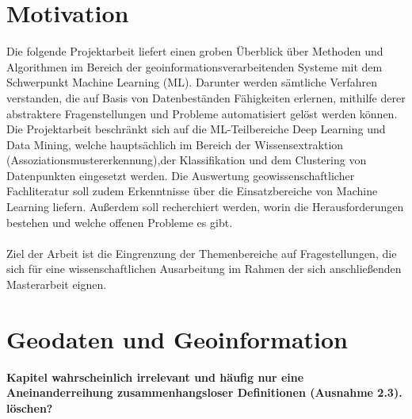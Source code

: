 \documentclass[11pt,ceqn]{book}
\begin{document}
\chapter{Motivation}
Die folgende Projektarbeit liefert einen groben Überblick über Methoden und Algorithmen im Bereich der geoinformationsverarbeitenden Systeme mit dem Schwerpunkt Machine Learning (ML). Darunter werden sämtliche Verfahren verstanden, die auf Basis von Datenbeständen  Fähigkeiten erlernen, mithilfe derer abstraktere Fragenstellungen und Probleme automatisiert gelöst werden können. Die Projektarbeit beschränkt sich auf die ML-Teilbereiche Deep Learning und Data Mining, welche hauptsächlich im Bereich der Wissensextraktion (Assoziationsmustererkennung),der Klassifikation und dem Clustering von Datenpunkten eingesetzt werden. Die Auswertung geowissenschaftlicher Fachliteratur soll zudem Erkenntnisse über die Einsatzbereiche von Machine Learning liefern. Außerdem soll recherchiert werden, worin die Herausforderungen bestehen und welche offenen Probleme es gibt.
\\~\\
Ziel der Arbeit ist die Eingrenzung der Themenbereiche auf Fragestellungen, die sich für eine wissenschaftlichen Ausarbeitung im Rahmen der sich anschließenden Masterarbeit eignen.

\chapter{Geodaten und Geoinformation}

\textbf{Kapitel wahrscheinlich irrelevant und häufig nur eine Aneinanderreihung zusammenhangsloser Definitionen (Ausnahme 2.3). löschen?}
\end{document}
